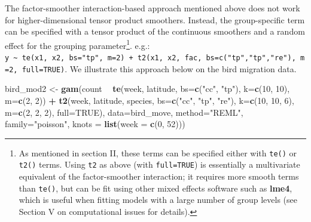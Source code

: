 \documentclass[12pt]{article}
\newenvironment{Shaded}{\begin{snugshade}}{\end{snugshade}}
\newcommand{\KeywordTok}[1]{\textcolor[rgb]{0.13,0.29,0.53}{\textbf{#1}}}
\newcommand{\DataTypeTok}[1]{\textcolor[rgb]{0.13,0.29,0.53}{#1}}
\newcommand{\DecValTok}[1]{\textcolor[rgb]{0.00,0.00,0.81}{#1}}
\newcommand{\StringTok}[1]{\textcolor[rgb]{0.31,0.60,0.02}{#1}}
\newcommand{\OtherTok}[1]{\textcolor[rgb]{0.56,0.35,0.01}{#1}}
\newcommand{\OperatorTok}[1]{\textcolor[rgb]{0.81,0.36,0.00}{\textbf{#1}}}
\newcommand{\NormalTok}[1]{#1}
\let\rmarkdownfootnote\footnote%
\def\footnote{\protect\rmarkdownfootnote}
\begin{document}
The factor-smoother interaction-based approach mentioned above does not
work for higher-dimensional tensor product smoothers. Instead, the
group-specific term can be specified with a tensor product of the
continuous smoothers and a random effect for the grouping
parameter\footnote{As mentioned in section II, these terms can be
  specified either with \texttt{te()} or \texttt{t2()} terms. Using
  \texttt{t2} as above (with \texttt{full=TRUE}) is essentially a
  multivariate equivalent of the factor-smoother interaction; it
  requires more smooth terms than \texttt{te()}, but can be fit using
  other mixed effects software such as \textbf{lme4}, which is useful
  when fitting models with a large number of group levels (see Section V
  on computational issues for details).}. e.g.:
\texttt{y\ \textasciitilde{}\ te(x1,\ x2,\ bs="tp",\ m=2)\ +\ t2(x1,\ x2,\ fac,\ bs=c("tp","tp","re"),\ m=2,\ full=TRUE)}.
We illustrate this approach below on the bird migration data.

\begin{Shaded}
\begin{Highlighting}[]
\NormalTok{bird_mod2 <-}\StringTok{ }\KeywordTok{gam}\NormalTok{(count }\OperatorTok{~}\StringTok{ }\KeywordTok{te}\NormalTok{(week, latitude, }\DataTypeTok{bs=}\KeywordTok{c}\NormalTok{(}\StringTok{"cc"}\NormalTok{, }\StringTok{"tp"}\NormalTok{),}
                            \DataTypeTok{k=}\KeywordTok{c}\NormalTok{(}\DecValTok{10}\NormalTok{, }\DecValTok{10}\NormalTok{), }\DataTypeTok{m=}\KeywordTok{c}\NormalTok{(}\DecValTok{2}\NormalTok{, }\DecValTok{2}\NormalTok{)) }\OperatorTok{+}
\StringTok{                   }\KeywordTok{t2}\NormalTok{(week, latitude, species, }\DataTypeTok{bs=}\KeywordTok{c}\NormalTok{(}\StringTok{"cc"}\NormalTok{, }\StringTok{"tp"}\NormalTok{, }\StringTok{"re"}\NormalTok{),}
                      \DataTypeTok{k=}\KeywordTok{c}\NormalTok{(}\DecValTok{10}\NormalTok{, }\DecValTok{10}\NormalTok{, }\DecValTok{6}\NormalTok{), }\DataTypeTok{m=}\KeywordTok{c}\NormalTok{(}\DecValTok{2}\NormalTok{, }\DecValTok{2}\NormalTok{, }\DecValTok{2}\NormalTok{), }\DataTypeTok{full=}\OtherTok{TRUE}\NormalTok{),}
                 \DataTypeTok{data=}\NormalTok{bird_move, }\DataTypeTok{method=}\StringTok{"REML"}\NormalTok{, }\DataTypeTok{family=}\StringTok{"poisson"}\NormalTok{, }
                 \DataTypeTok{knots =} \KeywordTok{list}\NormalTok{(}\DataTypeTok{week =} \KeywordTok{c}\NormalTok{(}\DecValTok{0}\NormalTok{, }\DecValTok{52}\NormalTok{)))}
\end{Highlighting}
\end{Shaded}
\end{document}
